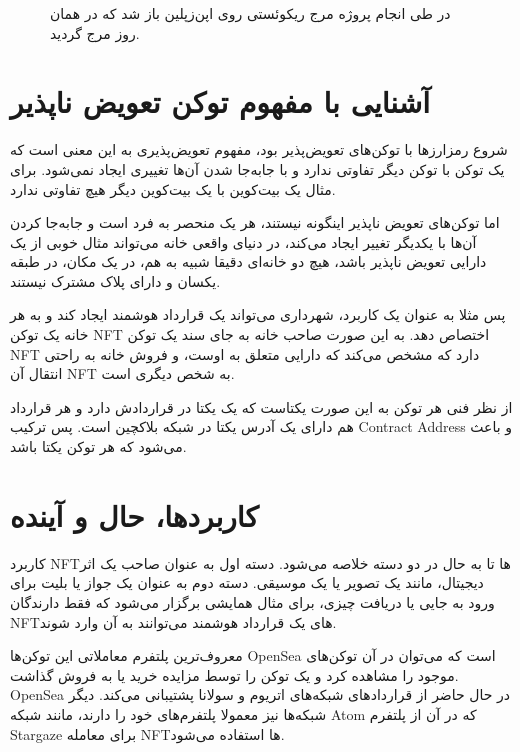 \begin{figure}[H]
\centerline{}
\caption{در طی انجام پروژه مرج ریکوئستی روی اپن‌زپلین باز شد که در همان روز مرج گردید.}
\label{fig:zeppelin-merge-req}
\end{figure}


\section{آشنایی با مفهوم توکن تعویض ناپذیر}
شروع رمزارزها با توکن‌های تعویض‌پذیر بود، مفهوم تعویض‌پذیری به این معنی است که یک توکن با توکن دیگر تفاوتی ندارد و با جابه‌جا شدن آن‌ها تغییری ایجاد نمی‌شود. برای مثال یک بیت‌کوین با یک بیت‌کوین دیگر هیچ تفاوتی ندارد.

اما توکن‌های تعویض ناپذیر اینگونه نیستند، هر یک منحصر به فرد است و جابه‌جا کردن آن‌ها با یکدیگر تغییر ایجاد می‌کند،‌ در دنیای واقعی خانه می‌تواند مثال خوبی از یک دارایی تعویض ناپذیر باشد، هیچ دو خانه‌ای دقیقا شبیه به هم، در یک مکان، در طبقه یکسان و دارای پلاک مشترک نیستند.

پس مثلا به عنوان یک کاربرد، شهرداری می‌تواند یک قرارداد هوشمند ایجاد کند و به هر خانه یک توکن NFT اختصاص دهد. به این صورت صاحب خانه به جای سند یک توکن NFT دارد که مشخص می‌کند که دارایی متعلق به اوست، و فروش خانه به راحتی انتقال آن NFT به شخص دیگری است.

از نظر فنی هر توکن به این صورت یکتاست که یک  یکتا در قراردادش دارد و هر قرارداد هم دارای یک آدرس یکتا در شبکه بلاکچین است. پس ترکیب Contract Address و  باعث می‌شود که هر توکن یکتا باشد.


\section{کاربردها، حال و آینده}
کاربرد NFTها تا به حال در دو دسته خلاصه می‌شود. دسته اول به عنوان صاحب یک اثر دیجیتال، مانند یک تصویر یا یک موسیقی. دسته دوم به عنوان یک جواز یا بلیت برای ورود به جایی یا دریافت چیزی، برای مثال همایشی برگزار می‌شود که فقط دارندگان NFTهای یک قرارداد هوشمند می‌توانند به آن وارد شوند.

معروف‌ترین پلتفرم معاملاتی این توکن‌ها OpenSea است که می‌توان در آن توکن‌های موجود را مشاهده کرد و یک توکن را توسط مزایده خرید یا به فروش گذاشت. OpenSea در حال حاضر از قراردادهای شبکه‌های اتریوم و سولانا پشتیبانی می‌کند. دیگر شبکه‌ها نیز معمولا پلتفرم‌های خود را دارند، مانند شبکه Atom که در آن از پلتفرم Stargaze برای معامله NFTها استفاده می‌شود.

